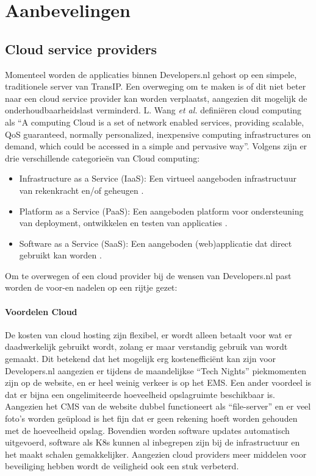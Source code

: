 \chapter{Aanbevelingen}

\label{Chapter8}

\section{Cloud service providers}
Momenteel worden de applicaties binnen Developers.nl gehost op een simpele, traditionele server van TransIP. Een overweging om te maken is of dit niet beter naar een cloud service provider kan worden verplaatst, aangezien dit mogelijk de onderhoudbaarheidslast verminderd. L. Wang \textit{et al.} \parencite{CloudPerspective} definiëren cloud computing als \enquote{A computing Cloud is a set of network enabled services, providing scalable, QoS guaranteed, normally personalized, inexpensive computing infrastructures on demand, which could be accessed in a simple and pervasive way}. Volgens \parencite{CloudPlatformsIntroduction} zijn er drie verschillende categorieën van Cloud computing:
\begin{itemize}
	\item Infrastructure as a Service (IaaS): Een virtueel aangeboden infrastructuur van rekenkracht en/of geheugen \parencite{CloudComputingAdvantages}.
	\item Platform as a Service (PaaS): Een aangeboden platform voor ondersteuning van deployment, ontwikkelen en testen van applicaties \parencite{TransformingCloud}.
	\item Software as a Service (SaaS): Een aangeboden (web)applicatie dat direct gebruikt kan worden \parencite{CloudComputingAdvantages}.
\end{itemize}

Om te overwegen of een cloud provider bij de wensen van Developers.nl past worden de voor-en nadelen op een rijtje gezet:
\subsubsection{Voordelen Cloud}
De kosten van cloud hosting zijn flexibel, er wordt alleen betaalt voor wat er daadwerkelijk gebruikt wordt, zolang er maar verstandig gebruik van wordt gemaakt. Dit betekend dat het mogelijk erg kostenefficiënt kan zijn voor Developers.nl aangezien er tijdens de maandelijkse \enquote{Tech Nights} piekmomenten zijn op de website, en er heel weinig verkeer is op het EMS. Een ander voordeel is dat er bijna een ongelimiteerde hoeveelheid opslagruimte beschikbaar is. Aangezien het CMS van de website dubbel functioneert als \enquote{file-server} en er veel foto's worden geüpload is het fijn dat er geen rekening hoeft worden gehouden met de hoeveelheid opslag. Bovendien worden software updates automatisch uitgevoerd, software als K8s kunnen al inbegrepen zijn bij de infrastructuur en het maakt schalen gemakkelijker. Aangezien cloud providers meer middelen voor beveiliging hebben wordt de veiligheid ook een stuk verbeterd.

